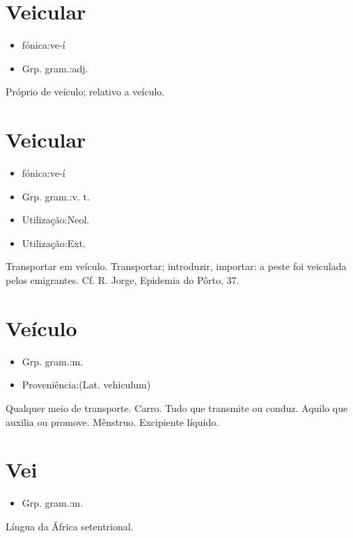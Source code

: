 \documentclass{article}
\begin{document}
\section{Veicular}
\begin{itemize}
\item {fónica:ve-í}
\end{itemize}
\begin{itemize}
\item {Grp. gram.:adj.}
\end{itemize}
Próprio de veículo; relativo a veículo.
\section{Veicular}
\begin{itemize}
\item {fónica:ve-í}
\end{itemize}
\begin{itemize}
\item {Grp. gram.:v. t.}
\end{itemize}
\begin{itemize}
\item {Utilização:Neol.}
\end{itemize}
\begin{itemize}
\item {Utilização:Ext.}
\end{itemize}
Transportar em veículo.
Transportar; introduzir, importar: \textunderscore a peste foi veiculada pelos emigrantes\textunderscore . Cf. R. Jorge, \textunderscore Epidemia do Pôrto\textunderscore , 37.
\section{Veículo}
\begin{itemize}
\item {Grp. gram.:m.}
\end{itemize}
\begin{itemize}
\item {Proveniência:(Lat. \textunderscore vehiculum\textunderscore )}
\end{itemize}
Qualquer meio de transporte.
Carro.
Tudo que transmite ou conduz.
Aquilo que auxilia ou promove.
Mênstruo.
Excipiente líquido.
\section{Vei}
\begin{itemize}
\item {Grp. gram.:m.}
\end{itemize}
Língua da África setentrional.
\end{document}
